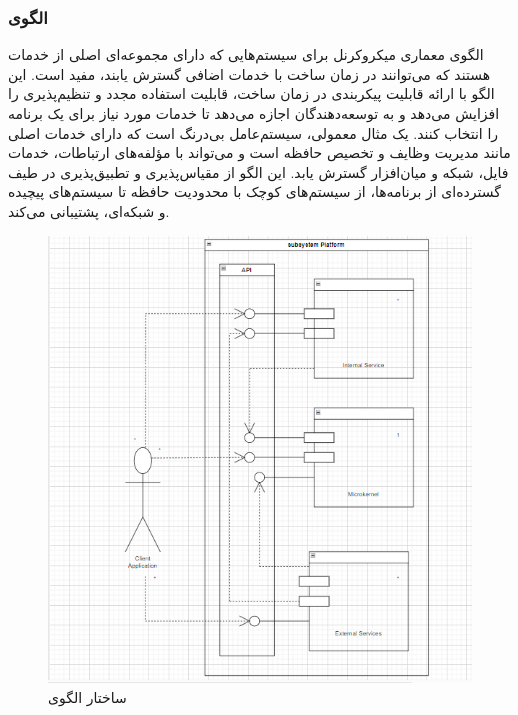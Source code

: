 \subsubsection{الگوی }
\label{archMicrokernelSec}
\begin{RTL}
الگوی معماری میکروکرنل \cite{ref4} برای سیستم‌هایی که دارای مجموعه‌ای اصلی
از خدمات هستند که می‌توانند در زمان ساخت با خدمات
اضافی گسترش یابند، مفید است.
این الگو با ارائه قابلیت پیکربندی در زمان ساخت،
قابلیت استفاده مجدد و تنظیم‌پذیری را افزایش می‌دهد و به توسعه‌دهندگان اجازه
می‌دهد تا خدمات مورد نیاز برای یک برنامه را انتخاب
کنند. یک مثال معمولی، سیستم‌عامل بی‌درنگ
است که دارای خدمات اصلی مانند مدیریت وظایف
و تخصیص حافظه است و می‌تواند با مؤلفه‌های ارتباطات،
خدمات فایل، شبکه و میان‌افزار گسترش یابد.
این الگو از مقیاس‌پذیری و تطبیق‌پذیری در
طیف گسترده‌ای از برنامه‌ها، از سیستم‌های کوچک با محدودیت
حافظه تا سیستم‌های پیچیده و شبکه‌ای، پشتیبانی می‌کند.
\end{RTL}
\begin{figure}[h!]
\centering
\includegraphics[scale=0.5]{images/first/microkernel.png}
\caption{ساختار الگوی }
\end{figure}